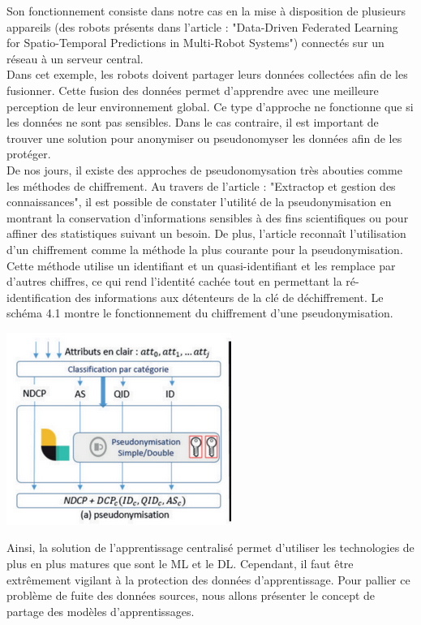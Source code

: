 \documentclass[12pt,a4paper,french]{report}
\begin{document}
Son fonctionnement consiste dans notre cas en la mise à disposition de plusieurs appareils (des robots présents dans l'article : "Data-Driven Federated Learning for Spatio-Temporal Predictions in Multi-Robot Systems") connectés sur un réseau à un serveur central.\\

Dans cet exemple, les robots doivent partager leurs données collectées afin de les fusionner. Cette fusion des données permet d’apprendre avec une meilleure perception de leur environnement global. Ce type d’approche ne fonctionne que si les données ne sont pas sensibles. Dans le cas contraire, il est important de trouver une solution pour anonymiser ou pseudonomyser les données afin de les protéger.\\

De nos jours, il existe des approches de pseudonomysation très abouties comme les méthodes de chiffrement. Au travers de l’article : "Extractop et gestion des connaissances", il est possible de constater l'utilité de la pseudonymisation en montrant la conservation d'informations sensibles à des fins scientifiques ou pour affiner des statistiques suivant un besoin. De plus, l’article reconnaît l'utilisation d'un chiffrement comme la méthode la plus courante pour la pseudonymisation. Cette méthode utilise un identifiant et un quasi-identifiant et les remplace par d'autres chiffres, ce qui rend l'identité cachée tout en permettant la ré-identification des informations aux détenteurs de la clé de déchiffrement. Le schéma 4.1 montre le fonctionnement du chiffrement d'une pseudonymisation.\\

\begin{center}
    \includegraphics[scale=0.7]{pseudo}
    \label{fig1}
\end{center} 

Ainsi, la solution de l’apprentissage centralisé permet d’utiliser les technologies de plus en plus matures que sont le ML et le DL. Cependant, il faut être extrêmement vigilant à la protection des données d'apprentissage. Pour pallier ce problème de fuite des données sources, nous allons présenter le concept de partage des modèles d’apprentissages.
\pagebreak
\end{document}
